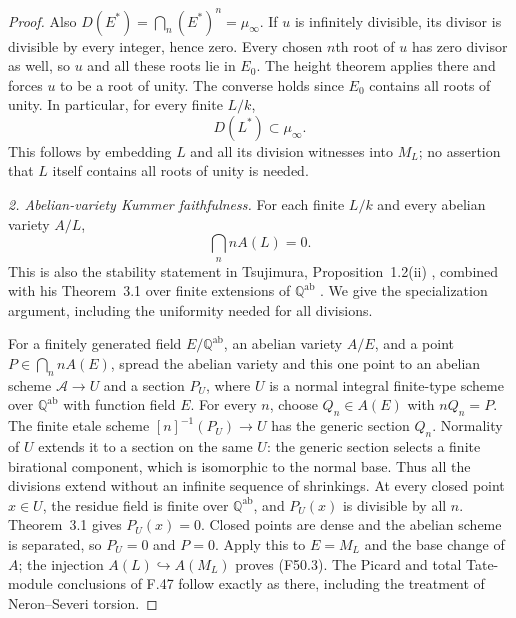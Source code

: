 \begin{proof}
Also $D(E^*)=\bigcap_n(E^*)^n=\mu_\infty$. If $u$ is infinitely
divisible, its divisor is divisible by every integer, hence zero.
Every chosen $n$th root of $u$ has zero divisor as well, so $u$ and
all these roots lie in $E_0$. The height theorem applies there and
forces $u$ to be a root of unity. The converse holds since $E_0$
contains all roots of unity. In particular, for every finite $L/k$,
\[
               D(L^*)\subset\mu_\infty.                  \tag{F50.2}
\]
This follows by embedding $L$ and all its division witnesses into
$M_L$; no assertion that $L$ itself contains all roots of unity is
needed.

\emph{2. Abelian-variety Kummer faithfulness.}
For each finite $L/k$ and every abelian variety $A/L$,
\[
                    \bigcap_n nA(L)=0.                    \tag{F50.3}
\]
This is also the stability statement in Tsujimura,
Proposition~1.2(ii) \citep{Tsujimura2022}, combined with his
Theorem~3.1 over finite extensions of $\mathbb Q^{\mathrm{ab}}$
\citep{Tsujimura2020}. We give the specialization argument, including
the uniformity needed for all divisions.

For a finitely generated field $E/\mathbb Q^{\mathrm{ab}}$, an
abelian variety $A/E$, and a point $P\in\bigcap_n nA(E)$, spread
the abelian variety and this one point to an abelian scheme
$\mathcal A\to U$ and a section $P_U$, where $U$ is a normal
integral finite-type scheme over $\mathbb Q^{\mathrm{ab}}$ with
function field $E$. For every $n$, choose $Q_n\in A(E)$ with
$nQ_n=P$. The finite etale scheme $[n]^{-1}(P_U)\to U$ has the
generic section $Q_n$. Normality of $U$ extends it to a section on
the same $U$: the generic section selects a finite birational
component, which is isomorphic to the normal base. Thus all the
divisions extend without an infinite sequence of shrinkings.
At every closed point $x\in U$, the residue field is finite over
$\mathbb Q^{\mathrm{ab}}$, and $P_U(x)$ is divisible by all $n$.
Theorem~3.1 gives $P_U(x)=0$. Closed points are dense and the
abelian scheme is separated, so $P_U=0$ and $P=0$.
Apply this to $E=M_L$ and the base change of $A$; the injection
$A(L)\hookrightarrow A(M_L)$ proves (F50.3). The Picard and total
Tate-module conclusions of F.47 follow exactly as there, including
the treatment of Neron--Severi torsion.


\end{proof}
